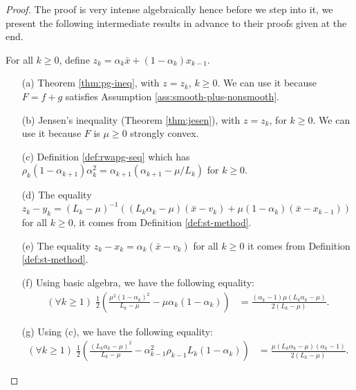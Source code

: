 \documentclass[12pt]{article}
\begin{document}
        \begin{proof}
            The proof is very intense algebraically hence before we step into it, we present the following intermediate results in advance to their proofs given at the end. 
            \par
            For all $k \ge 0$, define $z_k = \alpha_k \bar x + (1 - \alpha_k)x_{k - 1}$. 
            \begin{itemize}
                \item [(a)] Theorem \ref{thm:pg-ineq}, with $z = z_k$, $k \ge 0$. We can use it because $F = f + g$ satisfies Assumption \ref{ass:smooth-plus-nonsmooth}. 
                \item [(b)] Jensen's inequality (Theorem \ref{thm:jesen}), with $z = z_k$, for $k \ge 0$. We can use it because $F$ is $\mu \ge 0$ strongly convex. 
                \item [(c)] Definition \ref{def:rwapg-seq} which has $\rho_k(1 - \alpha_{k + 1})\alpha_k^2 = \alpha_{k + 1}(\alpha_{k + 1} - \mu/L_k)$ for $k \ge 0$.
                \item [(d)] The equality $z_k - y_k = (L_k - \mu)^{-1}((L_k\alpha_k - \mu)(\bar x - v_k) + \mu(1 - \alpha_k)(\bar x - x_{k - 1}))$ for all $k \ge 0$, it comes from Definition \ref{def:st-method}. 
                \item [(e)] The equality $z_k - x_k = \alpha_k(\bar x - v_k)$ for all $k \ge 0$ it comes from Definition \ref{def:st-method}. 
                \item [(f)] Using basic algebra, we have the following equality: 
                \begin{align*}
                    (\forall k \ge 1)\; \frac{1}{2}\left(
                        \frac{\mu^2(1 - \alpha_k)^2}{L_k - \mu} - \mu \alpha_k(1 - \alpha_k)
                    \right) &= 
                    \frac{(\alpha_k - 1)\mu(L_k\alpha_k - \mu)}{2(L_k - \mu)}. 
                \end{align*}
                \item [(g)] Using (c), we have the following equality: 
                \begin{align*}
                    (\forall k \ge 1)\; 
                    \frac{1}{2}\left(
                        \frac{(L_k\alpha_k - \mu)^2}{L_k - \mu} - 
                        \alpha_{k - 1}^2\rho_{k - 1}L_k(1 - \alpha_k)
                    \right)
                    &= 
                    \frac{\mu(L_k\alpha_k - \mu)(\alpha_k - 1)}{2(L_k - \mu)}. 
                \end{align*}

\end{itemize}
\end{proof}
\end{document}
